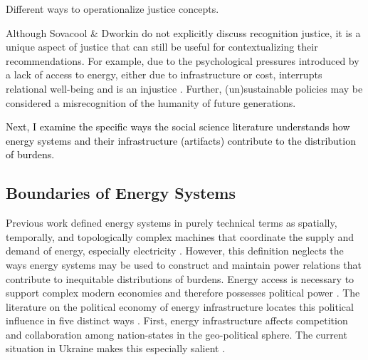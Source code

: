 \begin{table}[h]
    \centering
    \caption{Different ways to operationalize justice concepts.}
    
    \label{tab:justice-frameworks}
\end{table}

Although Sovacool \& Dworkin do not explicitly discuss recognition justice, it
is a unique aspect of justice that can still be useful for contextualizing their
recommendations. For example, due to the psychological pressures introduced by a
lack of access to energy, either due to infrastructure or cost, interrupts
relational well-being and is an injustice \cite{van_uffelen_revisiting_2022}.
Further, (un)sustainable policies may be considered a misrecognition of the
humanity of future generations.

\textcolor{black}{Next, I examine the specific ways the social science literature understands how energy systems and their infrastructure (artifacts) contribute to the distribution of burdens.}

\subsection{Boundaries of Energy Systems}
\label{section:energy-system-boundaries}
Previous work defined energy systems in purely technical terms as spatially,
temporally, and topologically complex machines that coordinate the supply and
demand of energy, especially electricity \cite{dotson_influence_2022}. However,
this definition neglects the ways energy systems may be used to construct and
maintain power relations that contribute to inequitable distributions of
burdens. Energy access is necessary to support complex modern economies and
therefore possesses political power \cite{jones_building_2013,
bridge_energy_2018}. The literature on the political economy of energy
infrastructure locates this political influence in five distinct ways
\cite{bridge_energy_2018}. First, energy infrastructure affects competition and
collaboration among nation-states in the geo-political sphere. The current
situation in Ukraine makes this especially salient
\cite{figueiredo_impacts_2022}. 

